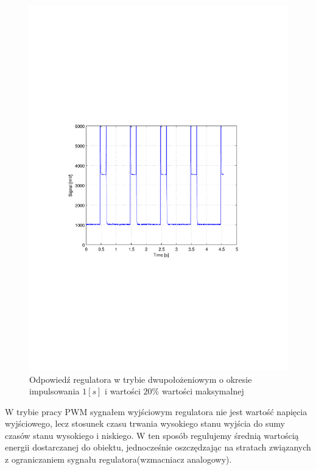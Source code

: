 \documentclass[12pt]{article}
\begin{document}
\begin{figure}[!htb]
	\begin{center}
		\includegraphics[width=15cm,trim=3cm 9cm 3cm 9cm,clip]
		{../res/img/dism_20_1.pdf}
	\end{center} 
	\caption{Odpowiedź regulatora w trybie dwupołożeniowym o okresie impulsowania
	$1[s]$ i wartości $20\%$ wartości maksymalnej}
\end{figure}

W trybie pracy PWM sygnałem wyjściowym regulatora nie jest wartość napięcia
wyjściowego, lecz stosunek czasu trwania wysokiego stanu wyjścia do sumy czasów
stanu wysokiego i niskiego. W ten sposób regulujemy średnią wartością energii
dostarczanej do obiektu, jednocześnie oszczędzając na stratach związanych z
ograniczaniem sygnału regulatora(wzmacniacz analogowy).

\newpage
\end{document}
